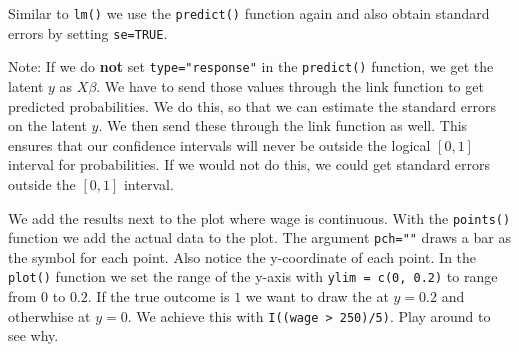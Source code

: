 \documentclass[]{article}
\newenvironment{Shaded}{\begin{snugshade}}{\end{snugshade}}
\newcommand{\CommentTok}[1]{\textcolor[rgb]{0.56,0.35,0.01}{\textit{#1}}}
\newcommand{\DataTypeTok}[1]{\textcolor[rgb]{0.13,0.29,0.53}{#1}}
\newcommand{\DecValTok}[1]{\textcolor[rgb]{0.00,0.00,0.81}{#1}}
\newcommand{\KeywordTok}[1]{\textcolor[rgb]{0.13,0.29,0.53}{\textbf{#1}}}
\newcommand{\NormalTok}[1]{#1}
\newcommand{\OperatorTok}[1]{\textcolor[rgb]{0.81,0.36,0.00}{\textbf{#1}}}
\newcommand{\OtherTok}[1]{\textcolor[rgb]{0.56,0.35,0.01}{#1}}
\newcommand{\StringTok}[1]{\textcolor[rgb]{0.31,0.60,0.02}{#1}}
\begin{document}
Similar to \texttt{lm()} we use the \texttt{predict()} function again and also obtain standard errors by setting \texttt{se=TRUE}.

Note: If we do \textbf{not} set \texttt{type="response"} in the \texttt{predict()} function, we get the latent \(y\) as \(X\beta\). We have to send those values through the link function to get predicted probabilities. We do this, so that we can estimate the standard errors on the latent \(y\). We then send these through the link function as well. This ensures that our confidence intervals will never be outside the logical \([0, 1]\) interval for probabilities. If we would not do this, we could get standard errors outside the \([0, 1]\) interval.

\begin{Shaded}
\end{Shaded}

We add the results next to the plot where wage is continuous. With the \texttt{points()} function we add the actual data to the plot. The argument \texttt{pch="\textbar{}"} draws a bar as the symbol for each point. Also notice the y-coordinate of each point. In the \texttt{plot()} function we set the range of the y-axis with \texttt{ylim\ =\ c(0,\ 0.2)} to range from \(0\) to \(0.2\). If the true outcome is \(1\) we want to draw the \textbar{} at \(y=0.2\) and otherwhise at \(y=0\). We achieve this with \texttt{I((wage\ \textgreater{}\ 250)/5)}. Play around to see why.
\end{document}
